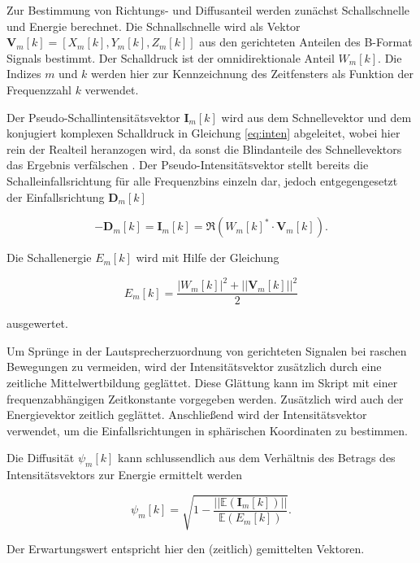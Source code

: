 Zur Bestimmung von Richtungs- und Diffusanteil werden zunächst Schallschnelle und Energie berechnet. Die Schnallschnelle wird als Vektor $\textbf{V}_{m}[k] = [X_{m}[k], Y_{m}[k], Z_{m}[k]]$ aus den gerichteten Anteilen des B-Format Signals bestimmt. Der Schalldruck ist der omnidirektionale Anteil $W_{m}[k]$. Die Indizes $m$ und $k$ werden hier zur Kennzeichnung des Zeitfensters als Funktion der Frequenzzahl $k$ verwendet.

Der Pseudo-Schallintensitätsvektor $\textbf{I}_{m}[k]$ wird aus dem Schnellevektor und dem konjugiert komplexen Schalldruck in Gleichung \ref{eq:inten} abgeleitet, wobei hier rein der Realteil heranzogen wird, da sonst die Blindanteile des Schnellevektors das Ergebnis verfälschen \cite{pulkki}. Der Pseudo-Intensitätsvektor stellt bereits die Schalleinfallsrichtung für alle Frequenzbins einzeln dar, jedoch entgegengesetzt der Einfallsrichtung $\textbf{D}_{m}[k]$

\begin{equation}
    -\textbf{D}_{m}[k] = \textbf{I}_{m}[k] = \Re(W_{m}[k]^{*} \cdot \textbf{V}_{m}[k]) .
    \label{eq:inten}
\end{equation}

Die Schallenergie $E_{m}[k]$ wird mit Hilfe der Gleichung

\begin{equation}
    E_{m}[k] = \frac{|W_{m}[k]|^2+||\textbf{V}_{m}[k]||^2}{2}
    \label{eq:energy}
\end{equation}

ausgewertet.

Um Sprünge in der Lautsprecherzuordnung von gerichteten Signalen bei raschen Bewegungen zu vermeiden, wird der Intensitätsvektor zusätzlich durch eine zeitliche Mittelwertbildung geglättet. Diese Glättung kann im Skript mit einer frequenzabhängigen Zeitkonstante vorgegeben werden. Zusätzlich wird auch der Energievektor zeitlich geglättet. Anschließend wird der Intensitätsvektor verwendet, um die Einfallsrichtungen in sphärischen Koordinaten zu bestimmen.

Die Diffusität $\psi_{m}[k]$ kann schlussendlich aus dem Verhältnis des Betrags des Intensitätsvektors zur Energie ermittelt werden

\begin{equation}
    \psi_{m}[k] = \sqrt{1 - \frac{||\mathbb{E}(\textbf{I}_{m}[k])||}{\mathbb{E}(E_{m}[k])}} .
    \label{eq:diff}
\end{equation}

 Der Erwartungswert entspricht hier den (zeitlich) gemittelten Vektoren.

